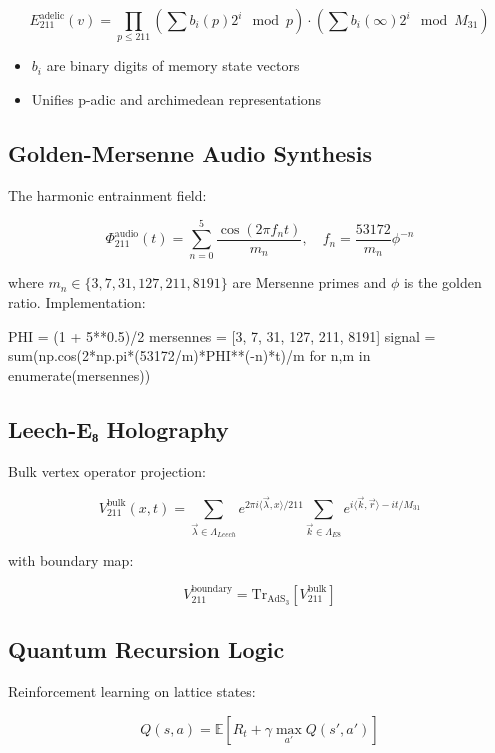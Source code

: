 \documentclass[12pt]{article}
\begin{document}
\begin{center}
\[
E_{211}^{\text{adelic}}(v) = \prod_{p\leq211}\left(\sum b_i(p)2^i \mod p\right) \cdot \left(\sum b_i(\infty)2^i \mod M_{31}\right)
\]

\begin{itemize}
    \item $b_i$ are binary digits of memory state vectors
    \item Unifies p-adic and archimedean representations
\end{itemize}

\subsection{Golden-Mersenne Audio Synthesis}
\label{subsec:audio}

The harmonic entrainment field:

\[
\Phi_{211}^{\text{audio}}(t) = \sum_{n=0}^5 \frac{\cos(2\pi f_n t)}{m_n}, \quad f_n = \frac{53172}{m_n}\phi^{-n}
\]

where $m_n \in \{3,7,31,127,211,8191\}$ are Mersenne primes and $\phi$ is the golden ratio. Implementation:

\begin{python}
PHI = (1 + 5**0.5)/2
mersennes = [3, 7, 31, 127, 211, 8191]
signal = sum(np.cos(2*np.pi*(53172/m)*PHI**(-n)*t)/m 
           for n,m in enumerate(mersennes))
\end{python}

\subsection{Leech-E₈ Holography}
\label{subsec:holography}

Bulk vertex operator projection:

\[
V_{211}^{\text{bulk}}(x,t) = \sum_{\vec{\lambda}\in\Lambda_{Leech}} e^{2\pi i\langle\vec{\lambda},x\rangle/211} \sum_{\vec{k}\in\Lambda_{E8}} e^{i\langle\vec{k},\vec{r}\rangle - it/M_{31}}
\]

with boundary map:

\[
V_{211}^{\text{boundary}} = \text{Tr}_{\text{AdS}_3}\left[V_{211}^{\text{bulk}}\right]
\]

\subsection{Quantum Recursion Logic}
\label{subsec:qrl}

Reinforcement learning on lattice states:

\[
Q(s,a) = \mathbb{E}\left[R_t + \gamma\max_{a'}Q(s',a')\right]
\]


\end{center}
\end{document}
